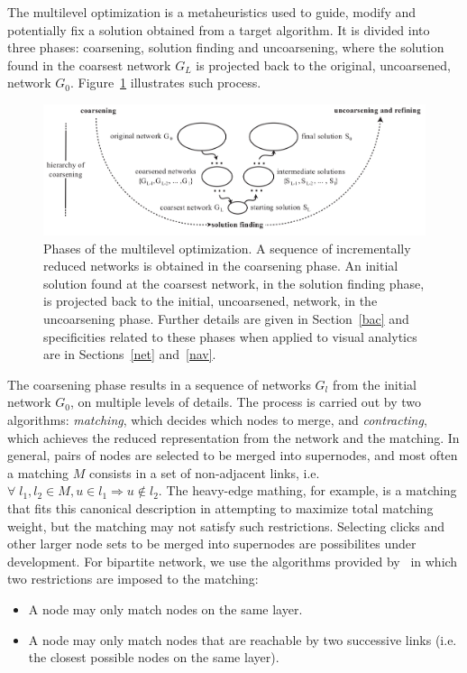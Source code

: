 \documentclass[runningheads]{llncs}
\begin{document}
The multilevel optimization is a metaheuristics used to guide,
modify and potentially fix a solution obtained from a target algorithm.
It is divided into three phases: coarsening, solution finding and uncoarsening,
where the solution found in the coarsest network $G_L$ is projected back to the original,
uncoarsened, network $G_0$.
Figure~\ref{mlf} illustrates such process.

\begin{figure}[!h]\centering
 \includegraphics[width=\textwidth]{mlf}
  \caption{Phases of the multilevel optimization.
  A sequence of incrementally reduced networks is obtained in the coarsening phase.
  An initial solution found at the coarsest network, in the solution finding phase,
  is projected back to the initial, uncoarsened, network, in the uncoarsening phase.
  Further details are given in Section~\ref{bac} and specificities related to these
  phases when applied to visual analytics are in Sections~\ref{net} and~\ref{nav}.
  }\label{mlf}
\end{figure}

The coarsening phase results in a sequence of networks $G_l$ from the initial network $G_0$,
on multiple levels of details.
The process is carried out by two algorithms: \emph{matching}, which decides which nodes to merge,
and \emph{contracting}, which achieves the reduced representation from the network and the matching.
In general, pairs of nodes are selected to be merged into supernodes, and
most often a matching $M$ consists in a set of non-adjacent links,
i.e. $\forall\; l_1, l_2 \in M, u \in l_1 \Rightarrow u \notin l_2$.
The heavy-edge mathing, for example, is a matching that fits this canonical description
in attempting to maximize total matching weight, but the matching may not satisfy such restrictions.
Selecting clicks and other larger node sets to be merged into supernodes are possibilites
under development.
For bipartite network, we use the algorithms provided by~\cite{alan2} in which two restrictions
are imposed to the matching:
\begin{itemize}
  \item A node may only match nodes on the same layer.
  \item A node may only match nodes that are reachable by two successive links
    (i.e. the closest possible nodes on the same layer).
\end{itemize}
\end{document}
